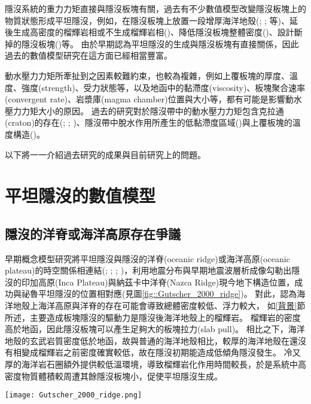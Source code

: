 隱沒系統的重力力矩直接與隱沒板塊有關，過去有不少數值模型改變隱沒板塊上的物質狀態形成平坦隱沒，例如，在隱沒板塊上放置一段增厚海洋地殼(\citealp{van2002role}; \citealp{Liu2016}; \citealp{Hu2016}等)、延後生成高密度的榴輝岩相或不生成榴輝岩相(\citealp{van2002role})、降低隱沒板塊整體密度(\citealp{Gerya2009})、設計斷掉的隱沒板塊(\citealp{Liu2016})等。
由於早期認為平坦隱沒的生成與隱沒板塊有直接關係，因此過去的數值模型研究在這方面已經相當豐富。

動水壓力力矩所牽扯到之因素較難約束，也較為複雜，例如上覆板塊的厚度、溫度、強度(strength)、受力狀態等，以及地函中的黏滯度(viscosity)、板塊聚合速率(convergent rate)、岩漿庫(magma chamber)位置與大小等，都有可能是影響動水壓力力矩大小的原因。
過去的研究對於隱沒帶中的動水壓力力矩包含克拉通(craton)的存在(\citealp{Manea2012Chile}; \citealp{Liu2016}; \citealp{Hu2016})、隱沒帶中脫水作用所產生的低黏滯度區域(\citealp{Manea2007})與上覆板塊的溫度構造(\citealp{Thermal2012})。

以下將一一介紹過去研究的成果與目前研究上的問題。

\section{平坦隱沒的數值模型}\label{平坦隱沒的數值模型}
\subsection{隱沒的洋脊或海洋高原存在爭議}\label{隱沒的洋脊或海洋高原存在爭議}
早期概念模型研究將平坦隱沒與隱沒的洋脊(oceanic ridge)或海洋高原(oceanic plateau)的時空關係相連結(\citealp{pilger1981plate}; \citealp{henderson1984mesozoic}; \citealp{Gutscher2000A}; \citealp{gutscher2002andean})，\citealp{Gutscher2000A}利用地震分布與早期地震波層析成像勾勒出隱沒的印加高原(Inca Plateau)與納茲卡中洋脊(Nazca Ridge)現今地下構造位置，成功與祕魯平坦隱沒的位置相對應(見圖\ref{fig::Gutscher_2000_ridge})。
對此，\citealp{Gutscher2000A}認為海洋地殼上海洋高原與洋脊的存在可能會導致總體密度較低、浮力較大，
如\ref{背景}節所述，主要造成板塊隱沒的驅動力是隱沒後海洋地殼上的榴輝岩。
榴輝岩的密度高於地函，因此隱沒板塊可以產生足夠大的板塊拉力(slab pull)。
相比之下，海洋地殼的玄武岩質密度低於地函，故與普通的海洋地殼相比，較厚的海洋地殼在還沒有相變成榴輝岩之前密度確實較低，故在隱沒初期能造成低傾角隱沒發生。
冷又厚的海洋岩石圈額外提供較低溫環境，導致榴輝岩化作用時間較長，於是系統中高密度物質體積較周遭其餘隱沒板塊小，促使平坦隱沒生成。

\begin{figure*}[htp]
    \centering
    \texttt{[image: Gutscher\_2000\_ridge.png]}
    \caption[南美洲板塊構造圖，摘自\citealp{Gutscher2000A}]{南美洲板塊構造圖，摘自\citealp{Gutscher2000A}。粗黑線標出平坦隱沒段，灰色陰影區標示隱沒的海洋高原與洋脊，三角形為活動火山。板塊聚合速率由白色箭頭標出，數值參考自\citealp{demets1990current}。
    }
    \label{fig::Gutscher_2000_ridge}
\end{figure*}

